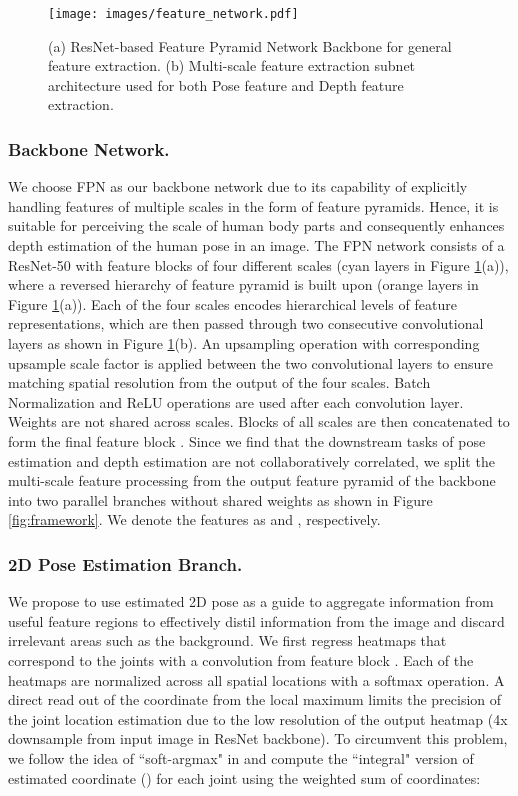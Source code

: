 \documentclass[runningheads]{llncs}
\begin{document}
\begin{figure}[t]
\centering
\texttt{[image: images/feature\_network.pdf]}
\caption{(a) ResNet-based Feature Pyramid Network Backbone for general feature extraction. (b) Multi-scale feature extraction subnet architecture used for both Pose feature and Depth feature extraction.}
\label{fig:feature_network}
\end{figure}

\subsubsection{Backbone Network.}
We choose FPN \cite{lin2017feature} as our backbone network due to its capability of explicitly handling features of multiple scales in the form of feature pyramids. Hence, it is suitable for perceiving the scale of human body parts and consequently enhances depth estimation of the human pose in an image. The FPN network consists of a ResNet-50 \cite{he2016deep} with feature blocks of four different scales  (cyan layers in Figure \ref{fig:feature_network}(a)), where a reversed hierarchy of feature pyramid  is built upon (orange layers in Figure \ref{fig:feature_network}(a)). Each of the four scales encodes hierarchical levels of feature representations, which are then passed through two consecutive convolutional layers as shown in Figure \ref{fig:feature_network}(b). An upsampling operation with corresponding upsample scale factor is applied between the two convolutional layers to ensure matching spatial resolution from the output of the four scales. 
Batch Normalization \cite{ioffe2015batch} and ReLU operations are used after each convolution layer. Weights are not shared across scales. Blocks of all scales are then concatenated to form the final feature block .
Since we find that the downstream tasks of pose estimation and depth estimation are not collaboratively correlated, we split the multi-scale feature processing from the output feature pyramid  of the backbone into two parallel branches without shared weights as shown in Figure \ref{fig:framework}. We denote the features as  and , respectively.

\subsubsection{2D Pose Estimation Branch.}
We propose to use estimated 2D pose as a guide to aggregate information from useful feature regions to effectively distil information from the image and discard irrelevant areas such as the background. 
We first regress  heatmaps  that correspond to the  joints with a  convolution from feature block . Each of the  heatmaps are normalized across all spatial locations with a softmax operation. A direct read out of the coordinate from the local maximum limits the precision of the joint location estimation due to the low resolution of the output heatmap (4x downsample from input image in ResNet backbone). To circumvent this problem, we follow the idea of ``soft-argmax" in \cite{sun2018integral} and compute the ``integral" version of estimated coordinate () for each joint  using the weighted sum of coordinates:
\end{document}
